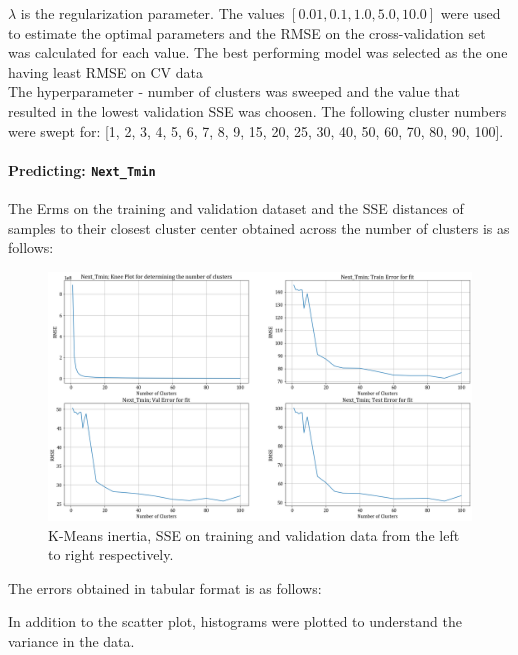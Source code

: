 \documentclass[12pt,a4paper]{article}
\newcommand{\noi}{\noindent}
\def\tt#1{\texttt{#1}}
\begin{document}
\noi
$\lambda$ is the regularization parameter. The values $[0.01, 0.1,  1.0, 5.0, 10.0]$ were used to estimate the optimal parameters and the RMSE on the cross-validation set was calculated for each value. The best performing model was selected as the one having least RMSE on CV data \\

\noi
The hyperparameter - number of clusters was sweeped and the value that resulted in the lowest validation SSE was choosen. The following cluster numbers were swept for: [1, 2, 3, 4, 5, 6, 7, 8, 9, 15, 20, 25, 30, 40, 50, 60, 70, 80, 90, 100].

\paragraph{Predicting: \tt{Next\_Tmin}}
The Erms on the training and validation dataset and the SSE distances of samples to their closest cluster center obtained across the number of clusters is as follows:
\begin{figure}[H]
     \centering
     \includegraphics[scale=0.4]{images/t3_d3/no_reg/tmin_errors.png}
     \caption{K-Means inertia, SSE on training and validation data from the left to right respectively.}
\end{figure}

\vspace{-1em}
The errors obtained in tabular format is as follows:


\noi
In addition to the scatter plot, histograms were plotted to understand the variance in the data.\\
\end{document}
